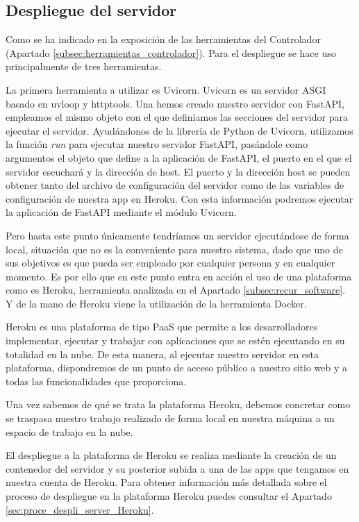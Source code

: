 \subsection{Despliegue del servidor} \label{subsec:despl_servidor_heroku}

Como se ha indicado en la exposición de las herramientas del Controlador (Apartado \ref{subsec:herramientas_controlador}). Para el despliegue se hace uso principalmente de tres herramientas.

La primera herramienta a utilizar es Uvicorn. Uvicorn es un servidor ASGI basado en uvloop y httptools. Una hemos creado nuestro servidor con FastAPI, empleamos el mismo objeto con el que definíamos las secciones del servidor para ejecutar el servidor. Ayudándonos de la librería de Python de Uvicorn, utilizamos la función \textit{run} para ejecutar nuestro servidor FastAPI, pasándole como argumentos el objeto que define a la aplicación de FastAPI, el puerto en el que el servidor escuchará y la dirección de host. El puerto y la dirección host se pueden obtener tanto del archivo de configuración del servidor como de las variables de configuración de nuestra app en Heroku. Con esta información podremos ejecutar la aplicación de FastAPI mediante el módulo Uvicorn.

Pero hasta este punto únicamente tendríamos un servidor ejecutándose de forma local, situación que no es la conveniente para nuestro sistema, dado que uno de sus objetivos es que pueda ser empleado por cualquier persona y en cualquier momento. Es por ello que en este punto entra en acción el uso de una plataforma como es Heroku, herramienta analizada en el Apartado \ref{subsec:recur_software}. Y de la mano de Heroku viene la utilización de la herramienta Docker.

Heroku es una plataforma de tipo \gls{PaaS} que permite a los desarrolladores implementar, ejecutar y trabajar con aplicaciones que se estén ejecutando en su totalidad en la nube. De esta manera, al ejecutar nuestro servidor en esta plataforma, dispondremos de un punto de acceso público a nuestro sitio web y a todas las funcionalidades que proporciona.

Una vez sabemos de qué se trata la plataforma Heroku, debemos concretar como se traspasa nuestro trabajo realizado de forma local en nuestra máquina a un espacio de trabajo en la nube.

El despliegue a la plataforma de Heroku se realiza mediante la creación de un contenedor del servidor y su posterior subida a una de las apps que tengamos en nuestra cuenta de Heroku. Para obtener información más detallada sobre el proceso de despliegue en la plataforma Heroku puedes consultar el Apartado \ref{sec:proce_despli_server_Heroku}.


